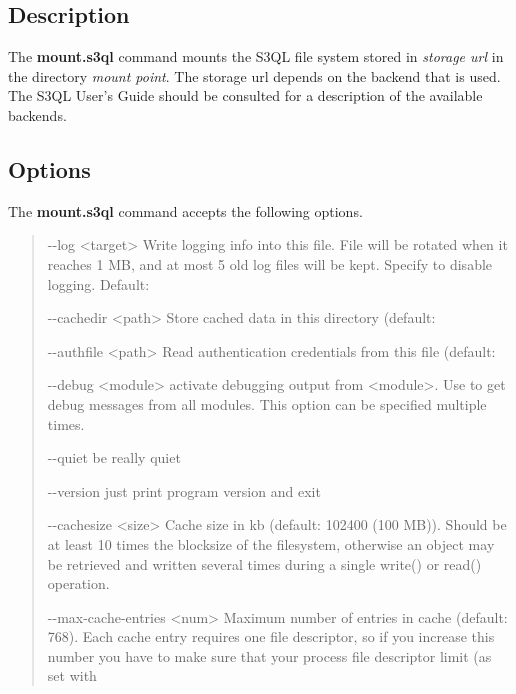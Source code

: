 \documentclass[letterpaper,10pt,english]{sphinxmanual}
\begin{document}
\subsection{Description}
\label{man/mount:description}
The \textbf{mount.s3ql} command mounts the S3QL file system stored in \emph{storage
url} in the directory \emph{mount point}. The storage url depends on the
backend that is used. The S3QL User's Guide should be consulted for a
description of the available backends.


\subsection{Options}
\label{man/mount:options}
The \textbf{mount.s3ql} command accepts the following options.
\begin{quote}
\begin{optionlist}{3cm}
\item [-{-}log \textless{}target\textgreater{}]  
Write logging info into this file. File will be
rotated when it reaches 1 MB, and at most 5 old log
files will be kept. Specify  to disable
logging. Default: 
\item [-{-}cachedir \textless{}path\textgreater{}]  
Store cached data in this directory (default:
\item [-{-}authfile \textless{}path\textgreater{}]  
Read authentication credentials from this file
(default: 
\item [-{-}debug \textless{}module\textgreater{}]  
activate debugging output from \textless{}module\textgreater{}. Use  to
get debug messages from all modules. This option can
be specified multiple times.
\item [-{-}quiet]  
be really quiet
\item [-{-}version]  
just print program version and exit
\item [-{-}cachesize \textless{}size\textgreater{}]  
Cache size in kb (default: 102400 (100 MB)). Should be
at least 10 times the blocksize of the filesystem,
otherwise an object may be retrieved and written
several times during a single write() or read()
operation.
\item [-{-}max-cache-entries \textless{}num\textgreater{}]  
Maximum number of entries in cache (default: 768).
Each cache entry requires one file descriptor, so if
you increase this number you have to make sure that
your process file descriptor limit (as set with

\end{optionlist}
\end{quote}
\end{document}
